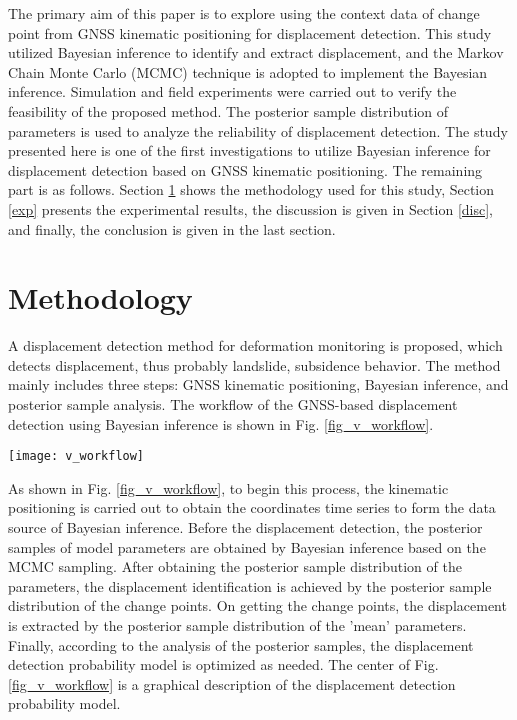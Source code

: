 \documentclass[final,3p,times]{elsarticle}
\begin{document}
	The primary aim of this paper is to explore using the context data of change point from GNSS kinematic positioning for displacement detection. 
	This study utilized Bayesian inference to identify and extract displacement, and the Markov Chain Monte Carlo (MCMC) technique is adopted to implement the Bayesian inference. 
	Simulation and field experiments were carried out to verify the feasibility of the proposed method. 
	The posterior sample distribution of parameters is used to analyze the reliability of displacement detection. 
	The study presented here is one of the first investigations to utilize Bayesian inference for displacement detection based on GNSS kinematic positioning. 
	The remaining part is as follows. Section \ref{method} shows the methodology used for this study, Section \ref{exp} presents the experimental results, the discussion is given in Section \ref{disc}, and finally, the conclusion is given in the last section.
	
	
	\section{Methodology}
	\label{method}
	\textcolor{r_s}{A displacement detection method for deformation monitoring is proposed, which detects displacement, thus probably landslide, subsidence behavior. The method mainly includes three steps: GNSS kinematic positioning, Bayesian inference, and posterior sample analysis. The workflow of the GNSS-based displacement detection using Bayesian inference is shown in Fig. \ref{fig_v_workflow}.}
	\begin{figure*}[htpb]
		\centering
		\texttt{[image: v\_workflow]}
		\caption{\textcolor{r_s}{Displacement detection based on Bayesian inference from GNSS Kinematic Positioning.}}
		\label{fig_v_workflow}
	\end{figure*} 
	
	As shown in Fig. \ref{fig_v_workflow}, to begin this process, the kinematic positioning is carried out to obtain the coordinates time series to form the data source of Bayesian inference. 
	Before the displacement detection,  the posterior samples of model parameters are obtained by Bayesian inference based on the MCMC sampling.
	After obtaining the posterior sample distribution of the parameters, the displacement identification is achieved by the posterior sample distribution of the change points.
	On getting the change points, the displacement is extracted by the posterior sample distribution of  the 'mean' parameters.
	Finally, according to the analysis of the posterior samples, the \textcolor{r_s}{displacement detection probability model } is optimized as needed. \textcolor{r_s}{The center of Fig. \ref{fig_v_workflow} is a graphical description of the displacement detection probability model.}
\end{document}
